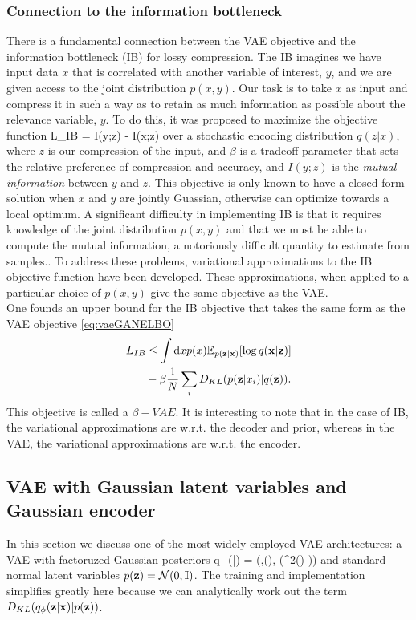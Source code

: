 \subsubsection{Connection to the information bottleneck}
There is a fundamental connection between the VAE objective and the information bottleneck (IB) for lossy compression. The IB imagines we have input data $x$ that is correlated with another variable of interest, $y$, and we are given access to the joint distribution $p(x,y)$. Our task is to take $x$ as input and compress it in such a way as to retain as much information as possible about the relevance variable, $y$. To do this, it was proposed to maximize the objective function
\be 
L_{IB} = I(y;z) - \beta I(x;z) 
\ee 
over a stochastic encoding distribution $q(z|x)$, where $z$ is our compression of the input, and $\beta$ is a tradeoff parameter that sets the relative preference of compression and accuracy, and $I(y;z)$ is the \emph{mutual information} between $y$ and $z$. This objective is only known to have a closed-form solution when $x$ and $y$ are jointly Guassian, otherwise can optimize towards a local optimum. A significant difficulty in implementing IB is that it requires knowledge of the joint distribution $p(x,y)$ and that we must be able to compute the mutual information, a notoriously difficult quantity to estimate from samples.. To address these problems, variational approximations to the IB objective function have been developed. These approximations, when applied to a particular choice of $p(x,y)$ give the same objective as the VAE.\\
One founds an upper bound for the IB objective that takes the same form as the VAE objective \ref{eq:vaeGANELBO}
\begin{align}
	L_{IB} &\leq \int \mathrm{d} x p(x) \mathbb{E}_{p(\mathbf{z}|\mathbf{x})}[\log q(\mathbf{x} |\mathbf{z})] \\
	&-\beta \frac{1}{N} \sum_i D_{KL}(p(\mathbf{z}|x_i)|q(\mathbf{z}))\nonumber.
\end{align}
This objective is called a $\beta-VAE$. It is interesting to note that in the case of IB, the variational approximations are w.r.t. the decoder and prior, whereas in the VAE, the variational approximations are w.r.t. the encoder.


\subsection{VAE with Gaussian latent variables and Gaussian encoder}
\label{subsec:vaeGaussian}
In this section we discuss one of the most widely employed VAE architectures: a VAE with factoruzed Gaussian posteriors 
\bse 
q_\phi (\mz |\mx) = (\mz,\mm(\mx), (\mathbf{\sigma}^2(\mx) ))
\ese 
and standard normal latent variables $p(\mathbf{z})=\mathcal{N}(0,\mathbb{I})$. The training and implementation simplifies greatly here because we can analytically work out the term $D_{KL}(q_\phi(\mathbf{z}|\mathbf{x}) |p(\mathbf{z}))$.

